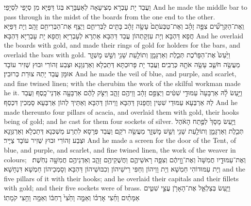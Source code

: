 {וַעֲבַד יָת עָבְרָא מְצִיעָאָה לְאַעְבָּרָא בְּגוֹ דַּפַּיָּא מִן סְיָפֵי לִסְיָפֵי׃}
{And he made the middle bar to pass through in the midst of the boards from the one end to the other.}{}
{וְֽאֶת־הַקְּרָשִׁ֞ים צִפָּ֣ה זָהָ֗ב וְאֶת־טַבְּעֹתָם֙ עָשָׂ֣ה זָהָ֔ב בָּתִּ֖ים לַבְּרִיחִ֑ם וַיְצַ֥ף אֶת־הַבְּרִיחִ֖ם זָהָֽב׃}
{וְיָת דַּפַּיָּא חֲפָא דַּהְבָּא וְיָת עִזְקָתְהוֹן עֲבַד דַּהְבָּא אַתְרָא לְעָבְרַיָּא וַחֲפָא יָת עָבְרַיָּא דַּהְבָּא׃}
{And he overlaid the boards with gold, and made their rings of gold for holders for the bars, and overlaid the bars with gold.}{}
{וַיַּ֙עַשׂ֙ אֶת־הַפָּרֹ֔כֶת תְּכֵ֧לֶת וְאַרְגָּמָ֛ן וְתוֹלַ֥עַת שָׁנִ֖י וְשֵׁ֣שׁ מׇשְׁזָ֑ר מַעֲשֵׂ֥ה חֹשֵׁ֛ב עָשָׂ֥ה אֹתָ֖הּ כְּרֻבִֽים׃}
{וַעֲבַד יָת פָּרוּכְתָּא דְּתַכְלָא וְאַרְגְּוָנָא וּצְבַע זְהוֹרִי וּבוּץ שְׁזִיר עוֹבָד אוּמָּן עֲבַד יָתַהּ צוּרַת כְּרוּבִין׃}
{And he made the veil of blue, and purple, and scarlet, and fine twined linen; with the cherubim the work of the skilful workman made he it.}{}
{וַיַּ֣עַשׂ לָ֗הּ אַרְבָּעָה֙ עַמּוּדֵ֣י שִׁטִּ֔ים וַיְצַפֵּ֣ם זָהָ֔ב וָוֵיהֶ֖ם זָהָ֑ב וַיִּצֹ֣ק לָהֶ֔ם אַרְבָּעָ֖ה אַדְנֵי־כָֽסֶף׃}
{וַעֲבַד לַהּ אַרְבְּעָא עַמּוּדֵי שִׁטִּין וַחֲפָנוּן דַּהְבָּא וָוֵיהוֹן דַּהְבָּא וְאַתֵּיךְ לְהוֹן אַרְבְּעָא סָמְכִין דִּכְסַף׃}
{And he made thereunto four pillars of acacia, and overlaid them with gold, their hooks being of gold; and he cast for them four sockets of silver.}{}
{וַיַּ֤עַשׂ מָסָךְ֙ לְפֶ֣תַח הָאֹ֔הֶל תְּכֵ֧לֶת וְאַרְגָּמָ֛ן וְתוֹלַ֥עַת שָׁנִ֖י וְשֵׁ֣שׁ מׇשְׁזָ֑ר מַעֲשֵׂ֖ה רֹקֵֽם׃}
{וַעֲבַד פְּרָסָא לִתְרַע מַשְׁכְּנָא דְּתַכְלָא וְאַרְגְּוָנָא וּצְבַע זְהוֹרִי וּבוּץ שְׁזִיר עוֹבָד צַיָּיר׃}
{And he made a screen for the door of the Tent, of blue, and purple, and scarlet, and fine twined linen, the work of the weaver in colours;}{}
{וְאֶת־עַמּוּדָ֤יו חֲמִשָּׁה֙ וְאֶת־וָ֣וֵיהֶ֔ם וְצִפָּ֧ה רָאשֵׁיהֶ֛ם וַחֲשֻׁקֵיהֶ֖ם זָהָ֑ב וְאַדְנֵיהֶ֥ם חֲמִשָּׁ֖ה נְחֹֽשֶׁת׃ \petucha }
{וְיָת עַמּוּדוֹהִי חַמְשָׁא וְיָת וָוֵיהוֹן וְחַפִּי רֵישֵׁיהוֹן וְכִבּוּשֵׁיהוֹן דַּהְבָּא וְסָמְכֵיהוֹן חַמְשָׁא דִּנְחָשָׁא׃}
{and the five pillars of it with their hooks; and he overlaid their capitals and their fillets with gold; and their five sockets were of brass.}{}
\newperek
{}%
{וַיַּ֧עַשׂ בְּצַלְאֵ֛ל אֶת־הָאָרֹ֖ן עֲצֵ֣י שִׁטִּ֑ים אַמָּתַ֨יִם וָחֵ֜צִי אׇרְכּ֗וֹ וְאַמָּ֤ה וָחֵ֙צִי֙ רׇחְבּ֔וֹ וְאַמָּ֥ה וָחֵ֖צִי קֹמָתֽוֹ׃
}
